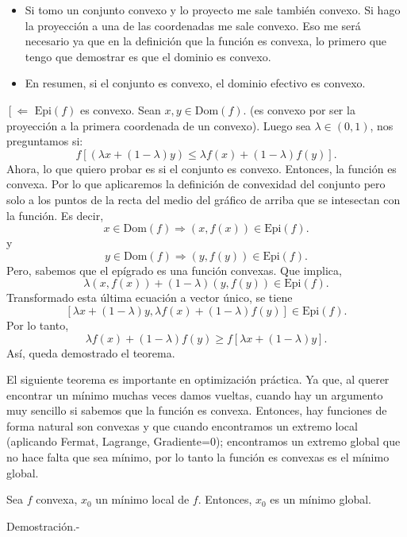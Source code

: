 \begin{paracol}{2}
\begin{teo}
{	\begin{itemize}
	    \item Si tomo un conjunto convexo y lo proyecto me sale también convexo. Si hago la proyección a una de las coordenadas me sale convexo. Eso me será necesario ya que en la definición que la función es convexa, lo primero que tengo que demostrar es que el dominio es convexo. 
	    \item En resumen, si el conjunto es convexo, el dominio efectivo es convexo.
	\end{itemize}
	}
    \switchcolumn[0]\noindent
    $\left[\Leftarrow\right.$ $\text{Epi}(f)$ es convexo. Sean $x,y\in \text{Dom}(f).$ (es convexo por ser la proyección a la primera coordenada de un convexo). Luego sea $\lambda \in (0,1)$, nos preguntamos si:
    $$f\left[\left(\lambda x + (1-\lambda)y\right)\leq \lambda f(x) + (1-\lambda)f(y)\right].$$
    Ahora, lo que quiero probar es si el conjunto es convexo. Entonces, la función es convexa. Por lo que aplicaremos la definición de convexidad del conjunto pero solo a los puntos de la recta del medio del gráfico de arriba que se intesectan con la función. Es decir, 
    $$x\in \text{Dom}(f) \Rightarrow (x,f(x))\in \text{Epi}(f).$$
    y 
    $$y\in \text{Dom}(f) \Rightarrow (y,f(y))\in \text{Epi}(f).$$
    Pero, sabemos que el epígrado es una función convexas. Que implica,
    $$\lambda (x,f(x)) + (1-\lambda)(y,f(y))\in \text{Epi}(f).$$
    Transformado esta última ecuación a vector único, se tiene
    $$\left[\lambda x + (1-\lambda)y,\lambda f(x) + (1-\lambda)f(y)\right]\in \text{Epi}(f).$$
    Por lo tanto,
    $$\lambda f(x) + (1-\lambda)f(y)\geq f\left[\lambda x + (1-\lambda)y\right].$$
    Así, queda demostrado el teorema.
\end{teo}

\begin{tcolorbox}[colframe=white]
    El siguiente teorema es importante en optimización práctica. Ya que, al querer encontrar un mínimo muchas veces damos vueltas, cuando hay un argumento muy sencillo si sabemos que la función es convexa. Entonces, hay funciones de forma natural son convexas y que cuando encontramos un extremo local (aplicando Fermat, Lagrange, Gradiente=0); encontramos un extremo global que no hace falta que sea mínimo, por lo tanto la función es convexas es el mínimo global. 
\end{tcolorbox}

\begin{teo} Sea $f$ convexa, $x_0$ un mínimo local de $f$. Entonces, $x_0$ es un mínimo global.

    Demostración.-\; 
\end{teo}


\end{paracol}
